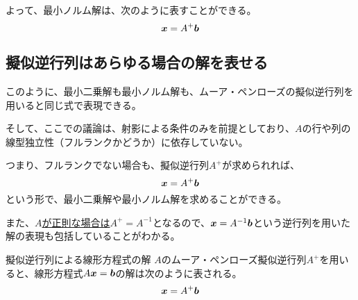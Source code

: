\documentclass[../../../topic_linear-algebra]{subfiles}
\begin{document}
よって、最小ノルム解は、次のように表すことができる。
\begin{equation*}
  \vb*{x} = A^+ \vb*{b}
\end{equation*}

\subsection{擬似逆行列はあらゆる場合の解を表せる}

このように、最小二乗解も最小ノルム解も、ムーア・ペンローズの擬似逆行列を用いると同じ式で表現できる。

そして、ここでの議論は、射影による条件のみを前提としており、$A$の行や列の線型独立性（フルランクかどうか）に依存していない。

\br

つまり、フルランクでない場合も、擬似逆行列$A^+$が求められれば、
\begin{equation*}
  \vb*{x} = A^+ \vb*{b}
\end{equation*}
という形で、最小二乗解や最小ノルム解を求めることができる。

\br

また、\hyperref[thm:pseudoinverse-of-invertible]{$A$が正則な場合は$A^+ = A^{-1}$}となるので、$\vb*{x} = A^{-1} \vb*{b}$という逆行列を用いた解の表現も包括していることがわかる。

\begin{theorem}{擬似逆行列による線形方程式の解}
  $A$のムーア・ペンローズ擬似逆行列$A^+$を用いると、線形方程式$A\vb*{x} = \vb*{b}$の解は次のように表される。
  \begin{equation*}
    \vb*{x} = A^+ \vb*{b}
  \end{equation*}
\end{theorem}
\end{document}
